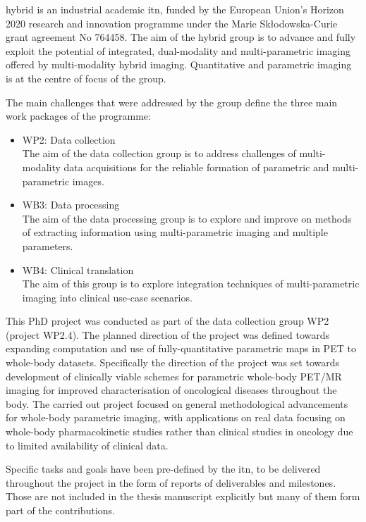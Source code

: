 \Gls{hybrid} is an industrial academic \gls{itn}, funded by the European Union's Horizon 2020 research and innovation programme under the Marie Sk\l{}odowska-Curie grant agreement No 764458.
The aim of the \gls{hybrid} group is to advance and fully exploit the potential of integrated, dual-modality and multi-parametric imaging offered by multi-modality hybrid imaging. Quantitative and parametric imaging is at the centre of focus of the group. 

The main challenges that were addressed by the group define the three main work packages of the programme:
\begin{itemize}
    \item WP2: Data collection \\
    The aim of the data collection group is to address challenges of multi-modality data acquisitions for the reliable formation of parametric and multi-parametric images. 
    \item WB3: Data processing \\
    The aim of the data processing group is to explore and improve on methods of extracting information using multi-parametric imaging and multiple parameters. 
    \item WB4: Clinical translation \\
    The aim of this group is to explore integration techniques of multi-parametric imaging into clinical use-case scenarios. 
\end{itemize}

This PhD project was conducted as part of the data collection group WP2 (project WP2.4). The planned direction of the project was defined towards expanding computation and use of fully-quantitative parametric maps in PET to whole-body datasets. Specifically the direction of the project was set towards development of clinically viable schemes for parametric whole-body PET/MR imaging for improved characterisation of oncological diseases throughout the body. The carried out project focused on general methodological advancements for whole-body parametric imaging, with applications on real data focusing on whole-body pharmacokinetic studies rather than clinical studies in oncology due to limited availability of clinical data.

Specific tasks and goals have been pre-defined by the \gls{itn}, to be delivered throughout the project in the form of reports of deliverables and milestones. Those are not included in the thesis manuscript explicitly but many of them form part of the contributions. 

